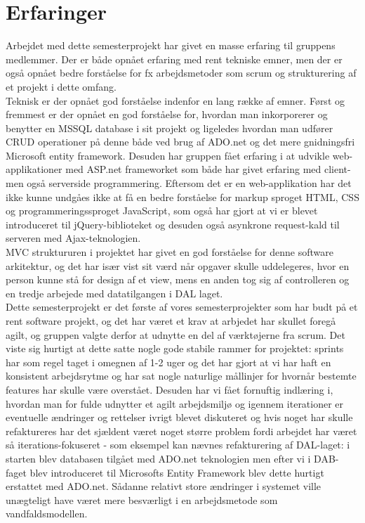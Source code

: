 \section{Erfaringer}
Arbejdet med dette semesterprojekt har givet en masse erfaring til gruppens medlemmer. Der er både opnået erfaring med rent tekniske emner, men der er også opnået bedre forståelse for fx arbejdsmetoder som scrum og strukturering af et projekt i dette omfang.\\
Teknisk er der opnået god forståelse indenfor en lang række af emner. Først og fremmest er der opnået en god forståelse for, hvordan man inkorporerer og benytter en MSSQL database i sit projekt og ligeledes hvordan man udfører CRUD operationer på denne både ved brug af ADO.net og det mere gnidningsfri Microsoft entity framework. Desuden har gruppen fået erfaring i at udvikle web-applikationer med ASP.net frameworket som både har givet erfaring med client- men også serverside programmering. Eftersom det er en web-applikation har det ikke kunne undgåes ikke at få en bedre forståelse for markup sproget HTML, CSS og programmeringssproget JavaScript, som også har gjort at vi er blevet introduceret til jQuery-biblioteket og desuden også asynkrone request-kald til serveren med Ajax-teknologien.\\
MVC struktururen i projektet har givet en god forståelse for denne software arkitektur, og det har især vist sit værd når opgaver skulle uddelegeres, hvor en person kunne stå for design af et view, mens en anden tog sig af controlleren og en tredje arbejede med datatilgangen i DAL laget. 
\\
Dette semesterprojekt er det første af vores semesterprojekter som har budt på et rent software projekt, og det har været et krav at arbjedet har skullet foregå agilt, og gruppen valgte derfor at udnytte en del af værktøjerne fra scrum. Det viste sig hurtigt at dette satte nogle gode stabile rammer for projektet: sprints har som regel taget i omegnen af 1-2 uger og det har gjort at vi har haft en konsistent arbejdsrytme og har sat nogle naturlige mållinjer for hvornår bestemte features har skulle være overstået. Desuden har vi fået fornuftig indlæring i, hvordan man for fulde udnytter et agilt arbejdsmiljø og igennem iterationer er eventuelle ændringer og rettelser ivrigt blevet diskuteret og hvis noget har skulle refaktureres har det sjældent været noget større problem fordi arbejdet har været så iterations-fokuseret - som eksempel kan nævnes refakturering af DAL-laget: i starten blev databasen tilgået med ADO.net teknologien men efter vi i DAB-faget blev introduceret til Microsofts Entity Framework blev dette hurtigt erstattet med ADO.net. Sådanne relativt store ændringer i systemet ville unægteligt have været mere besværligt i en arbejdsmetode som vandfaldsmodellen. \\

